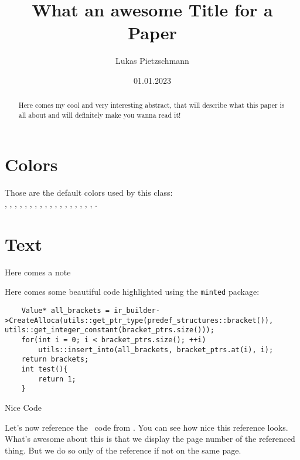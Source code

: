 \documentclass[english, sidenote]{article}
\title{What an awesome Title for a Paper}
\author{Lukas Pietzschmann}
\date{01.01.2023}
\begin{document}
\maketitle

\begin{abstract}
	Here comes my cool and very interesting abstract, that will describe what this paper is all about
	and will definitely make you wanna read it!
	\lipsum[2-3]
\end{abstract}

\tableofcontents

\emptypage
\setcounter{page}{1}

\section{Colors}
Those are the default colors used by this class:\\
, , , , , ,
, , , , , ,
, , , , , , .

\section{Text}
\lipsum[1-3]
Here comes a note
\lipsum[1]
\par
Here comes some beautiful code highlighted using the \texttt{minted} package:
\begin{listing}[H]
\begin{verbatim}
	Value* all_brackets = ir_builder->CreateAlloca(utils::get_ptr_type(predef_structures::bracket()), utils::get_integer_constant(bracket_ptrs.size()));
	for(int i = 0; i < bracket_ptrs.size(); ++i)
		utils::insert_into(all_brackets, bracket_ptrs.at(i), i);
	return brackets;
	int test(){
		return 1;
	}
\end{verbatim}
\caption{Nice Code}
\label{lst:test}
\end{listing}
\lipsum[1-4]\par
Let's now reference the \cpp~code from . You can see how nice this reference looks. What's awesome about this is that we display the page
number of the referenced thing. But we do so only of the reference if not on the same page.

\begin{appendix}
\listoflistings
\end{appendix}
\end{document}
